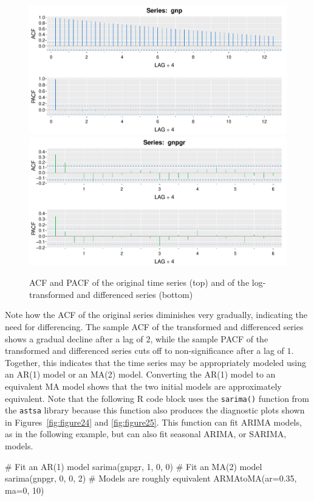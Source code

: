 \begin{figure}
\centering
\includegraphics[width=.75\textwidth]{figure22.pdf} \\
\includegraphics[width=.75\textwidth]{figure23.pdf}
\caption[ACF and PACF after transformations]{ACF and PACF of the original time series (top) and of the log-transformed and differenced series (bottom)}
\label{fig:figure22}
\end{figure}

Note how the ACF of the original series diminishes very gradually, indicating the need for differencing. The sample ACF of the transformed and differenced series shows a gradual decline after a lag of $2$, while the sample PACF of the transformed and differenced series cuts off to non-significance after a lag of $1$. Together, this indicates that the time series may be appropriately modeled using an AR(1) model or an MA(2) model. Converting the AR(1) model to an equivalent MA model shows that the two initial models are approximately equivalent. Note that the following R code block uses the \texttt{sarima()} function from the \texttt{astsa} library because this function also produces the diagnostic plots shown in Figures~\ref{fig:figure24} and \ref{fig:figure25}. This function can fit ARIMA models, as in the following example, but can also fit seasonal ARIMA, or SARIMA, models.

\begin{samepage}
\begin{Rcode}
# Fit an AR(1) model
sarima(gnpgr, 1, 0, 0)
# Fit an MA(2) model
sarima(gnpgr, 0, 0, 2)
# Models are roughly equivalent
ARMAtoMA(ar=0.35, ma=0, 10)
\end{Rcode}
\end{samepage}

